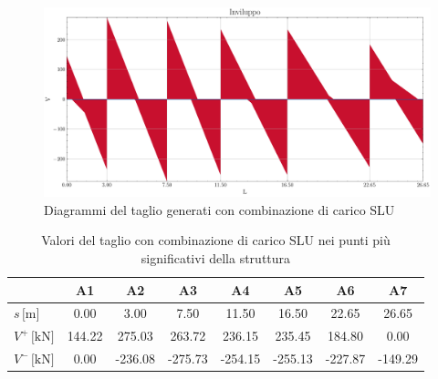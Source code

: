 \begin{landscape}
\begin{table}[H]
\end{table}
\clearpage
\begin{figure}[H]
	\centering
	\includegraphics[height=0.6\textwidth]{IMG/diagrammi_trave/ULS_V.pdf}
	\caption{Diagrammi del taglio generati con combinazione di carico SLU}
	\label{fig:trave_ULS_taglio}
	\end{figure}
	\begin{table}[H]
	\footnotesize
	\centering
	\caption{Valori del taglio con combinazione di carico SLU nei punti più significativi della struttura}
	\label{tab:trave_ULS_taglio}
		\begin{tabular}{lS[table-format=-3.2]S[table-format=-3.2]S[table-format=-3.2]S[table-format=-3.2]S[table-format=-3.2]S[table-format=-3.2]S[table-format=-3.2]}
			\toprule
			{}                           & {A1}   & {A2}    & {A3}    & {A4}    & {A5}    & {A6}    & {A7} \\
			\midrule
			$s\,\si{[\metre]}$			 & 0.00   & 3.00    & 7.50    & 11.50   & 16.50   & 22.65   & 26.65 \\
			$V^{+}\,\si{[\kilo\newton]}$ & 144.22 & 275.03  & 263.72  & 236.15  & 235.45  & 184.80  & 0.00 \\
			$V^{-}\,\si{[\kilo\newton]}$ & 0.00   & -236.08 & -275.73 & -254.15 & -255.13 & -227.87 & -149.29 \\
			\bottomrule
		\end{tabular}
	\end{table}
\clearpage

\end{landscape}
